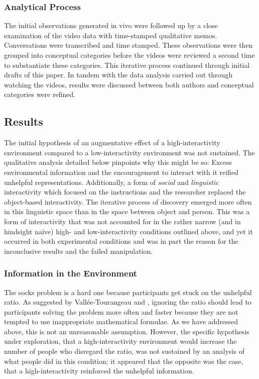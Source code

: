 \documentclass{article}
\begin{document}
\subsubsection{Analytical Process}

The initial observations generated in vivo were followed up by a close examination of the video data with time-stamped qualitative memos. Conversations were transcribed and time stamped. These observations were then grouped into conceptual categories before the videos were reviewed a second time to substantiate these categories. This iterative process continued through initial drafts of this paper. In tandem with the data analysis carried out through watching the videos, results were discussed between both authors and conceptual categories were refined. 

\subsection{Results}

The initial hypothesis of an augmentative effect of a high-interactivity environment compared to a low-interactivity environment was not sustained. The qualitative analysis detailed below pinpoints why this might be so: Excess environmental information and the encouragement to interact with it reified unhelpful representations. Additionally, a form of \emph{social} and \emph{linguistic} interactivity which focused on the instructions and the researcher replaced the object-based interactivity. The iterative process of discovery emerged more often in this linguistic space than in the space between object and person. This was a form of interactivity that was not accounted for in the rather narrow (and in hindsight naïve) high- and low-interactivity conditions outlined above, and yet it occurred in both experimental conditions and was in part the reason for the inconclusive results and the failed manipulation. 

\subsubsection{Information in the Environment}

The socks problem is a hard one because participants get stuck on the unhelpful ratio. As suggested by Vallée-Tourangeau and \parencite{March2020}, ignoring the ratio should lead to participants solving the problem more often and faster because they are not tempted to use inappropriate mathematical formulae. As we have addressed above, this is not an unreasonable assumption. However, the specific hypothesis under exploration, that a high-interactivity environment would increase the number of people who disregard the ratio, was not sustained by an analysis of what people did in this condition; it appeared that the opposite was the case, that a high-interactivity reinforced the unhelpful information. 
\end{document}
